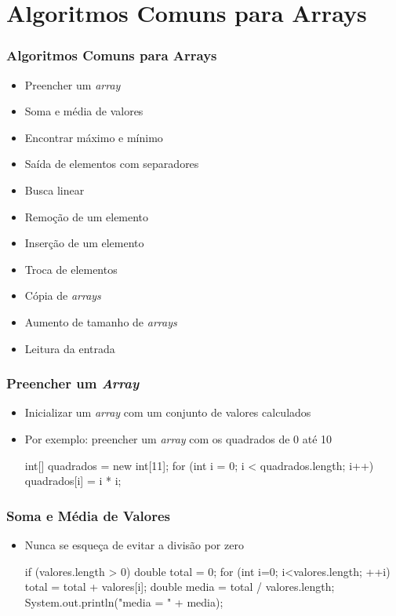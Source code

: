 \documentclass[xcolor={dvipsnames,table},aspectratio=169]{beamer}
\begin{document}
\section{Algoritmos Comuns para Arrays}

\begin{frame}\frametitle{Algoritmos Comuns para Arrays}
\begin{itemize}
	\item Preencher um \emph{array}
	\item Soma e média de valores
	\item Encontrar máximo e mínimo
	\item Saída de elementos com separadores
	\item Busca linear
	\item Remoção de um elemento
	\item Inserção de um elemento
	\item Troca de elementos
	\item Cópia de \emph{arrays}
	\item Aumento de tamanho de \emph{arrays}
	\item Leitura da entrada
\end{itemize}
\end{frame}

\begin{frame}[fragile]\frametitle{Preencher um \emph{Array}}
\begin{itemize}
	\item Inicializar um \emph{array} com um conjunto de valores calculados
	\item Por exemplo: preencher um \emph{array} com os quadrados de 0 até 10
\begin{javacode}
int[] quadrados = new int[11];
for (int i = 0; i < quadrados.length; i++) {
  quadrados[i] = i * i;
}
\end{javacode}
\end{itemize}
\end{frame}

\begin{frame}[fragile]\frametitle{Soma e Média de Valores}
\begin{itemize}
	\item Nunca se esqueça de evitar a divisão por zero
\begin{javacode}
if (valores.length > 0) {
   double total = 0;
   for (int i=0; i<valores.length; ++i)
      total = total + valores[i];
   double media = total / valores.length;
   System.out.println("media = " + media);
}
\end{javacode}
\end{itemize}
\end{frame}
\end{document}
